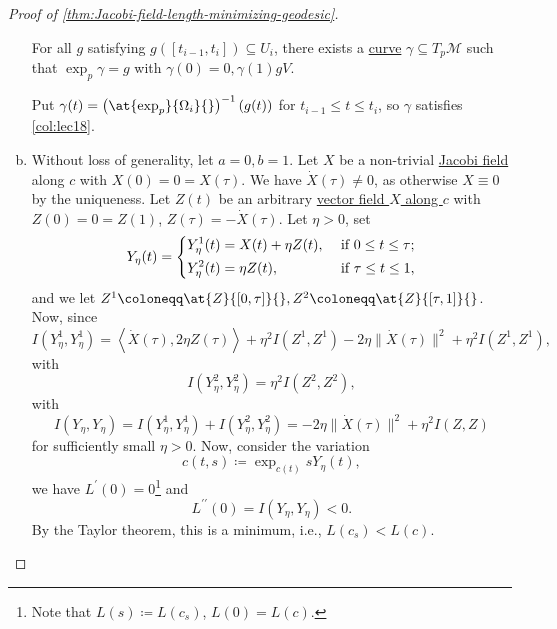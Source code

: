\begin{proof}[Proof of \autoref{thm:Jacobi-field-length-minimizing-geodesic}]
\begin{enumerate}[(a)]
		      \begin{claim}
			      For all \(g\) satisfying \(g([t_{i-1}, t_i]) \subseteq U_i\), there exists a \hyperref[def:curve]{curve} \(\gamma \subseteq T_p \mathcal{M} \) such that \(\exp _p \gamma = g\) with \(\gamma (0) = 0 , \gamma (1) g V\).
		      \end{claim}
		      \begin{explanation}
			      Put \(\gamma (t) = \left( \at{\exp _p}{\Omega _i}{} \right)^{-1} (g(t)) \) for \(t_{i-1} \leq t \leq t_i\), so \(\gamma \) satisfies \autoref{col:lec18}.
		      \end{explanation}
		\item  Without loss of generality, let \(a = 0, b= 1\). Let \(X\) be a non-trivial \hyperref[def:Jacobi-field]{Jacobi field} along \(c\) with \(X(0) = 0 = X(\tau )\). We have \(\dot{X} (\tau ) \neq 0\), as otherwise \(X \equiv 0\) by the uniqueness. Let \(Z(t)\) be an arbitrary \hyperref[def:vector-field-along-curve]{vector field \(X\) along \(c\)} with \(Z(0) = 0 = Z(1)\), \(Z(\tau ) = - \dot{X} (\tau )\). Let \(\eta > 0\), set
		      \[
			      Y_\eta (t) = \begin{dcases}
				      Y_\eta ^1(t) = X(t) + \eta Z(t), & \text{ if } 0 \leq t \leq \tau ; \\
				      Y_\eta ^2(t) = \eta Z(t),        & \text{ if } \tau \leq t \leq 1 ,
			      \end{dcases}
		      \]
		      and we let \(Z^1 \coloneqq \at{Z}{[0, \tau ]}{} , Z^2 \coloneqq \at{Z}{[\tau , 1]}{} \). Now, since
		      \[
			      I(Y_\eta ^1, Y_\eta ^1)
			      = \left\langle \dot{X} (\tau ), 2 \eta Z(\tau ) \right\rangle + \eta ^2 I(Z^1, Z^1) - 2 \eta \lVert \dot{X}(\tau)\rVert^2 + \eta ^2 I(Z^1, Z^1),
		      \]
		      with
		      \[
			      I(Y_\eta ^2, Y_\eta ^2) = \eta ^2 I(Z^2, Z^2),
		      \]
		      with
		      \[
			      I(Y_\eta , Y_\eta ) = I(Y_\eta ^1, Y_\eta ^1) + I(Y_\eta ^2, Y_\eta ^2) = -2 \eta \lVert \dot{X} (\tau ) \rVert ^2 + \eta ^2 I(Z, Z)
		      \]
		      for sufficiently small \(\eta > 0\). Now, consider the variation
		      \[
			      c(t, s) \coloneqq \exp _{c(t)} s Y_\eta (t),
		      \]
		      we have \(L^{\prime} (0) = 0\)\footnote{Note that \(L(s) \coloneqq L(c_s)\), \(L(0) = L(c)\).} and
		      \[
			      L^{\prime\prime} (0) = I(Y_\eta , Y_\eta ) < 0.
		      \]
		      By the Taylor theorem, this is a minimum, i.e., \(L(c_s) < L(c)\).
	\end{enumerate}
\end{proof}

